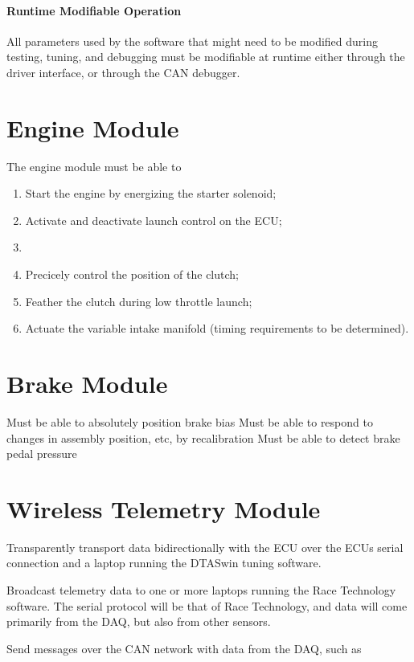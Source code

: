 \paragraph{Runtime Modifiable Operation}
All parameters used by the software that might need to be modified during testing, tuning, and debugging must be modifiable at runtime either through the driver interface, or through the CAN debugger.

\section{Engine Module}
The engine module must be able to
\begin{enumerate}
 \item Start the engine by energizing the starter solenoid;
 \item Activate and deactivate launch control on the ECU;
 \item 
 \item Precicely control the position of the clutch;
 \item Feather the clutch during low throttle launch;
 \item Actuate the variable intake manifold (timing requirements to be determined).
\end{enumerate}

\section{Brake Module}
Must be able to absolutely position brake bias
Must be able to respond to changes in assembly position, etc, by recalibration
Must be able to detect brake pedal pressure

\section{Wireless Telemetry Module}

Transparently transport data bidirectionally with the ECU over the ECUs serial
connection and a laptop running the DTASwin tuning software.

Broadcast telemetry data to one or more laptops running the Race Technology
software. The serial protocol will be that of Race Technology, and data will
come primarily from the DAQ, but also from other sensors.

Send messages over the CAN network with data from the DAQ, such as

